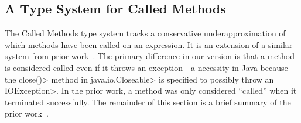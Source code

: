 


\subsection{A Type System for Called Methods}
\label{sec:called-methods}






The Called Methods type system tracks a conservative underapproximation of which methods have been called on an expression.
It is an extension of a similar system
from prior work~\cite{KelloggRSSE2020}.  The primary difference in our
version is that a method is considered called even if it throws an
exception---a necessity in Java because the \<close()> method
in \<java.io.Closeable> is specified to possibly throw an \<IOException>.
In the prior work, a method was only considered ``called'' when it terminated
successfully.
The remainder of this section is a brief summary
of the prior work~\cite{KelloggRSSE2020}.


